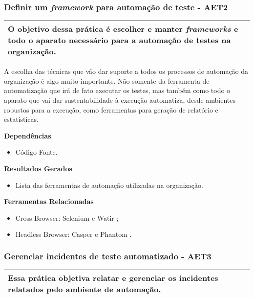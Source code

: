 \subsubsection{ Definir um \textit{framework} para automação de teste - AET2}
\label{sec:aet2}

\begin{table}[H]
\centering
\begin{tabular}{|p{130mm}|}
\hline
O objetivo dessa prática é escolher e manter \textit{frameworks} e todo o aparato necessário para a automação de testes na organização. \\ 
\hline
\end{tabular}
\end{table}

A escolha das técnicas que vão dar suporte a todos os processos de automação da organização é algo muito importante. Não somente da ferramenta de automatização que irá de fato executar os testes, mas também como todo o aparato que vai dar sustentabilidade à execução automatiza, desde ambientes robustos para a execução, como ferramentas para geração de relatório e estatísticas.

\textbf{Dependências}
\begin{itemize}
    \item Código Fonte.
\end{itemize}

\textbf{Resultados Gerados}
\begin{itemize}
    \item Lista das ferramentas de automação utilizadas na organização.
\end{itemize}

\textbf{Ferramentas Relacionadas}
\begin{itemize}
    \item Cross Browser: Selenium \cite{Selenium} e Watir \cite{Watir};
    \item Headless Browser: Casper \cite{Casper} e Phantom \cite{Phantom}.
\end{itemize}


\subsubsection{ Gerenciar incidentes de teste automatizado - AET3}
\label{sec:aet3}

\begin{table}[H]
\centering
\begin{tabular}{|p{130mm}|}
\hline
Essa prática objetiva relatar e gerenciar os incidentes relatados pelo ambiente de automação. \\ 
\hline
\end{tabular}
\end{table}

